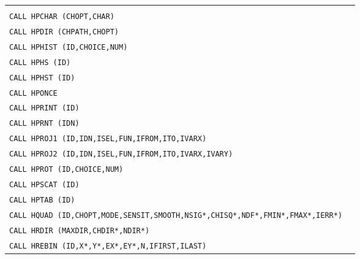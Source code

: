 \begin{longtable}{|>{\tt}p{.9\linewidth}r|}
&                                                       \pageref{HPARMN} \\
CALL     HPCHAR (CHOPT,CHAR)                 
&                                                       \pageref{HPCHAR} \\
CALL     HPDIR  (CHPATH,CHOPT)               
&                                                       \pageref{HPDIR}  \\
CALL     HPHIST (ID,CHOICE,NUM)              
&                                                       \pageref{HPHIST} \\
CALL     HPHS   (ID)                         
&                                                       \pageref{HPHS}   \\
CALL     HPHST  (ID)                         
&                                                       \pageref{HPHST}  \\
CALL     HPONCE                              
&                                                       \pageref{HPONCE} \\
CALL     HPRINT (ID)                         
&                                                       \pageref{HPRINT} \\
CALL     HPRNT (IDN)                         
&                                                       \pageref{HPRNT}  \\
CALL     HPROJ1 (ID,IDN,ISEL,FUN,IFROM,ITO,IVARX)
&                                                       \pageref{HPROJ1} \\
CALL     HPROJ2 (ID,IDN,ISEL,FUN,IFROM,ITO,IVARX,IVARY)
&                                                       \pageref{HPROJ2} \\
CALL     HPROT  (ID,CHOICE,NUM)              
&                                                       \pageref{HPROT}  \\
CALL     HPSCAT (ID)                         
&                                                       \pageref{HPSCAT} \\
CALL     HPTAB  (ID)                         
&                                                       \pageref{HPTAB}  \\
CALL     HQUAD  (ID,CHOPT,MODE,SENSIT,SMOOTH,NSIG*,CHISQ*,NDF*,FMIN*,FMAX*,IERR*)
&                                                       \pageref{HQUAD}  \\
CALL     HRDIR  (MAXDIR,CHDIR*,NDIR*)        
&                                                       \pageref{HRDIR}  \\
CALL     HREBIN (ID,X*,Y*,EX*,EY*,N,IFIRST,ILAST)

\end{longtable}
